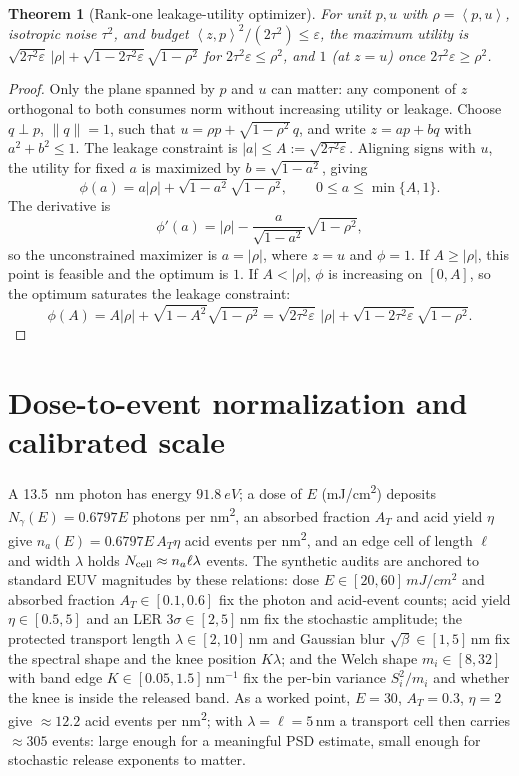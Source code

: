 \documentclass[11pt]{article}
\newtheorem{theorem}{Theorem}
\newcommand{\eps}{\varepsilon}
\newcommand{\inner}[2]{\left\langle #1,#2\right\rangle}
\begin{document}
\begin{theorem}[Rank-one leakage-utility optimizer]
\label{thm:minimax}
For unit \(p,u\) with \(\rho=\inner{p}{u}\), isotropic noise \(\tau^2\), and budget \(\inner{z}{p}^2/(2\tau^2)\le\eps\), the maximum utility is \(\sqrt{2\tau^2\eps}\,|\rho|+\sqrt{1-2\tau^2\eps}\sqrt{1-\rho^2}\) for \(2\tau^2\eps\le\rho^2\), and \(1\) (at \(z=u\)) once \(2\tau^2\eps\ge\rho^2\).
\end{theorem}

\begin{proof}
Only the plane spanned by \(p\) and \(u\) can matter: any component of \(z\) orthogonal to both consumes norm without increasing utility or leakage. Choose \(q\perp p\), \(\|q\|=1\), such that \(u=\rho p+\sqrt{1-\rho^2}\,q\), and write \(z=ap+bq\) with \(a^2+b^2\le1\). The leakage constraint is \(|a|\le A:=\sqrt{2\tau^2\eps}\). Aligning signs with \(u\), the utility for fixed \(a\) is maximized by \(b=\sqrt{1-a^2}\), giving
\[
\phi(a)=a|\rho|+\sqrt{1-a^2}\sqrt{1-\rho^2},\qquad 0\le a\le \min\{A,1\}.
\]
The derivative is
\[
\phi'(a)=|\rho|-\frac{a}{\sqrt{1-a^2}}\sqrt{1-\rho^2},
\]
so the unconstrained maximizer is \(a=|\rho|\), where \(z=u\) and \(\phi=1\). If \(A\ge|\rho|\), this point is feasible and the optimum is \(1\). If \(A<|\rho|\), \(\phi\) is increasing on \([0,A]\), so the optimum saturates the leakage constraint:
\[
\phi(A)=A|\rho|+\sqrt{1-A^2}\sqrt{1-\rho^2}
=\sqrt{2\tau^2\eps}\,|\rho|+\sqrt{1-2\tau^2\eps}\sqrt{1-\rho^2}.
\]
\end{proof}

\section{Dose-to-event normalization and calibrated scale}

A \SI{13.5}{nm} photon has energy \(\SI{91.8}{eV}\); a dose of \(E\) (\si{mJ/cm^2}) deposits \(N_\gamma(E)=0.6797E\) photons per \si{nm^2}, an absorbed fraction \(A_T\) and acid yield \(\eta\) give \(n_a(E)=0.6797E\,A_T\eta\) acid events per \si{nm^2}, and an edge cell of length \(\ell\) and width \(\lambda\) holds \(N_{\rm cell}\approx n_a\ell\lambda\) events. The synthetic audits are anchored to standard EUV magnitudes by these relations: dose \(E\in[20,60]\,\si{mJ/cm^2}\) and absorbed fraction \(A_T\in[0.1,0.6]\) fix the photon and acid-event counts; acid yield \(\eta\in[0.5,5]\) and an LER \(3\sigma\in[2,5]\,\mathrm{nm}\) fix the stochastic amplitude; the protected transport length \(\lambda\in[2,10]\,\mathrm{nm}\) and Gaussian blur \(\sqrt{\beta}\in[1,5]\,\mathrm{nm}\) fix the spectral shape and the knee position \(K\lambda\); and the Welch shape \(m_i\in[8,32]\) with band edge \(K\in[0.05,1.5]\,\mathrm{nm}^{-1}\) fix the per-bin variance \(S_i^2/m_i\) and whether the knee is inside the released band. As a worked point, \(E=30\), \(A_T=0.3\), \(\eta=2\) give \(\approx12.2\) acid events per \si{nm^2}; with \(\lambda=\ell=5\,\mathrm{nm}\) a transport cell then carries \(\approx305\) events: large enough for a meaningful PSD estimate, small enough for stochastic release exponents to matter.
\end{document}
